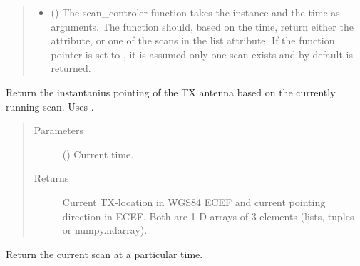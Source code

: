 \documentclass[letterpaper,10pt,english]{sphinxmanual}
\begin{document}
\begin{fulllineitems}
\begin{quote}
\begin{description}
\begin{itemize}
\item {} 
 () \textendash{} The scan\_controler function takes the {\hyperref[\detokenize{modules/antenna:antenna.AntennaTX}]{}} instance and the time as arguments. The function should, based on the time, return either the  attribute, or one of the scans in the list  attribute. If the function pointer is set to , it is assumed only one scan exists and by default  is returned.

\end{itemize}

\end{description}\end{quote}

\begin{fulllineitems}
\label{\detokenize{modules/antenna:antenna.AntennaTX.get_pointing}}
Return the instantanius pointing of the TX antenna based on the currently running scan. Uses {\hyperref[\detokenize{modules/antenna:antenna.AntennaTX.get_scan}]{}}.
\begin{quote}\begin{description}
\item[{Parameters}] \leavevmode
{} () \textendash{} Current time.

\item[{Returns}] \leavevmode
Current TX-location in WGS84 ECEF and current pointing direction in ECEF. Both are 1-D arrays of 3 elements (lists, tuples or numpy.ndarray).

\end{description}\end{quote}

\end{fulllineitems}


\begin{fulllineitems}
\label{\detokenize{modules/antenna:antenna.AntennaTX.get_scan}}
Return the current scan at a particular time.


\end{fulllineitems}
\end{fulllineitems}
\end{document}
